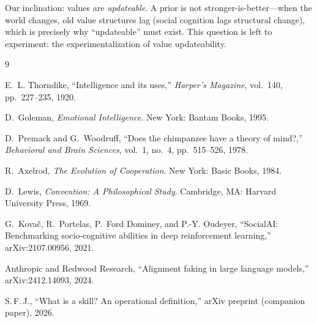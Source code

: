 \documentclass[11pt]{article}
\begin{document}
Our inclination: values are \emph{updateable}. A prior is not stronger-is-better---when the world changes, old value structures lag (social cognition lags structural change), which is precisely why ``updateable'' must exist. This question is left to experiment: the experimentalization of value updateability.

\begin{thebibliography}{9}

 E.~L. Thorndike, ``Intelligence and its uses,'' \emph{Harper's Magazine}, vol.~140, pp.~227--235, 1920.

 D.~Goleman, \emph{Emotional Intelligence}. New York: Bantam Books, 1995.

 D.~Premack and G.~Woodruff, ``Does the chimpanzee have a theory of mind?,'' \emph{Behavioral and Brain Sciences}, vol.~1, no.~4, pp.~515--526, 1978.

 R.~Axelrod, \emph{The Evolution of Cooperation}. New York: Basic Books, 1984.

 D.~Lewis, \emph{Convention: A Philosophical Study}. Cambridge, MA: Harvard University Press, 1969.

 G.~Kova\v{c}, R.~Portelas, P.~Ford Dominey, and P.-Y. Oudeyer, ``SocialAI: Benchmarking socio-cognitive abilities in deep reinforcement learning,'' arXiv:2107.00956, 2021.

 Anthropic and Redwood Research, ``Alignment faking in large language models,'' arXiv:2412.14093, 2024.

 S.\,F.\,J., ``What is a skill? An operational definition,'' arXiv preprint (companion paper), 2026.

\end{thebibliography}
\end{document}
